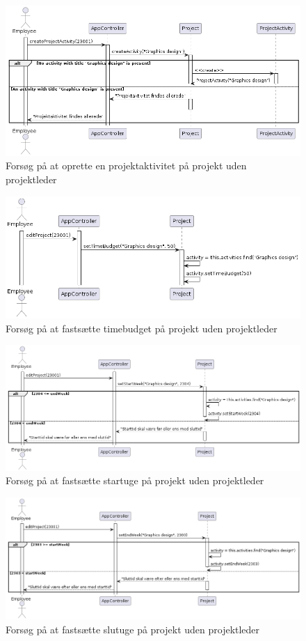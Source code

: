 \begin{figure}[H]
    \centering
    \caption{Forsøg på at oprette en projektaktivitet på projekt uden projektleder}\label{fig:sequence_create_PA_no_PL_1}
    \includegraphics[width = .75\textwidth]{Diagrams/createActivityNoPLCase1.png}
\end{figure}
\begin{figure}[H]
    \centering
    \caption{Forsøg på at fastsætte timebudget på projekt uden projektleder}\label{fig:sequence_create_PA_no_PL_2}
    \includegraphics[width = .75\textwidth]{Diagrams/createActivityNoPLCase2.png}
\end{figure}
\begin{figure}[H]
    \centering
    \caption{Forsøg på at fastsætte startuge på projekt uden projektleder}\label{fig:sequence_create_PA_no_PL_3}
    \includegraphics[width = .9\textwidth]{Diagrams/createActivityNoPLCase3.png}
\end{figure}
\begin{figure}[H]
    \centering
    \caption{Forsøg på at fastsætte slutuge på projekt uden projektleder}\label{fig:sequence_create_PA_no_PL_4}
    \includegraphics[width = .9\textwidth]{Diagrams/createActivityNoPLCase4.png}
\end{figure}
